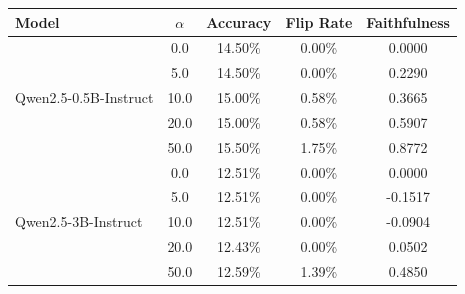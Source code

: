 \documentclass[preview, border=5mm]{standalone}
\begin{document}
\begin{minipage}{14cm}
    \centering
    \vspace{0.2cm}
    \begin{tabular}{l c c c c}
        \toprule
        \textbf{Model} & \textbf{$\alpha$} & \textbf{Accuracy} & \textbf{Flip Rate} & \textbf{Faithfulness} \\
        \midrule
        \multirow{5}{*}{Qwen2.5-0.5B-Instruct} 
        & 0.0 & 14.50\% & 0.00\% & 0.0000 \\
        & 5.0 & 14.50\% & 0.00\% & 0.2290 \\
        & 10.0 & 15.00\% & 0.58\% & 0.3665 \\
        & 20.0 & 15.00\% & 0.58\% & 0.5907 \\
        & 50.0 & 15.50\% & 1.75\% & 0.8772 \\
        \midrule
        \multirow{5}{*}{Qwen2.5-3B-Instruct} 
        & 0.0 & 12.51\% & 0.00\% & 0.0000 \\
        & 5.0 & 12.51\% & 0.00\% & -0.1517 \\
        & 10.0 & 12.51\% & 0.00\% & -0.0904 \\
        & 20.0 & 12.43\% & 0.00\% & 0.0502 \\
        & 50.0 & 12.59\% & 1.39\% & 0.4850 \\
        \bottomrule
    \end{tabular}
\end{minipage}
\end{document}

